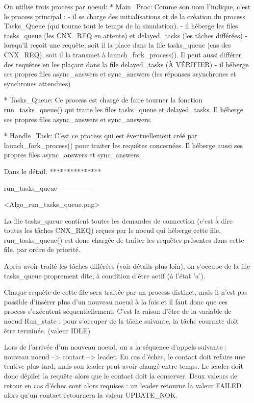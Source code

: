 On utilise trois process par noeud:
    * Main_Proc:
      Comme son nom l'indique, c'est le process principal :
        - il se charge des initialisations et de la création du process Tasks_Queue (qui tourne
          tout le temps de la simulation).
        - il héberge les files tasks_queue (les CNX_REQ en attente) et delayed_tasks (les tâches
          différées)
        - lorsqu'il reçoit une requête, soit il la place dans la file tasks_queue (cas des
          CNX_REQ), soit il la transmet à launch_fork_process(). Il peut aussi différer des requêtes
          en les plaçant dans la file delayed_tasks (À VÉRIFIER)
        - il héberge ses propres files async_answers et sync_answers (les réponses asynchrones et
          synchrones attendues)

    * Tasks_Queue:
      Ce process est chargé de faire tourner la fonction run_tasks_queue() qui traite les files
      tasks_queue et delayed_tasks.
      Il héberge ses propres files async_answers et sync_answers.

    * Handle_Task:
      C'est ce process qui est éventuellement créé par launch_fork_process() pour traiter les
      requêtes concernées.
      Il héberge aussi ses propres files async_answers et sync_answers.

Dans le détail.
***************

run_tasks_queue
---------------

<Algo_run_tasks_queue.png>

La file tasks_queue contient toutes les demandes de connection (c'est à dire toutes les tâches
CNX_REQ) reçues par le noeud qui héberge cette file. run_tasks_queue() est donc chargée de traiter
les requêtes présentes dans cette file, par ordre de priorité.

Après avoir traité les tâches différées (voir détails plus loin), on s'occupe de la file
tasks_queue proprement dite, à condition d'être actif (à l'état 'a').

Chaque requête de cette file sera traitée par un process distinct, mais il n'est pas possible
d'insérer plus d'un nouveau noeud à la fois et il faut donc que ces process s'exécutent
séquentiellement. C'est la raison d'être de la variable de noeud Run_state : pour s'occuper de la
tâche suivante, la tâche courante doit être terminée. (valeur IDLE)

Lors de l'arrivée d'un nouveau noeud, on a la séquence d'appels suivante : nouveau noeud -->
contact --> leader. En cas d'échec, le contact doit refaire une tentive plus tard, mais son leader
peut avoir changé entre temps. Le leader doit donc dépiler la requête alors que le contact doit la
conserver. Deux valeurs de retour en cas d'échec sont alors requises : un leader retourne la valeur
FAILED alors qu'un contact retournera la valeur UPDATE_NOK.

